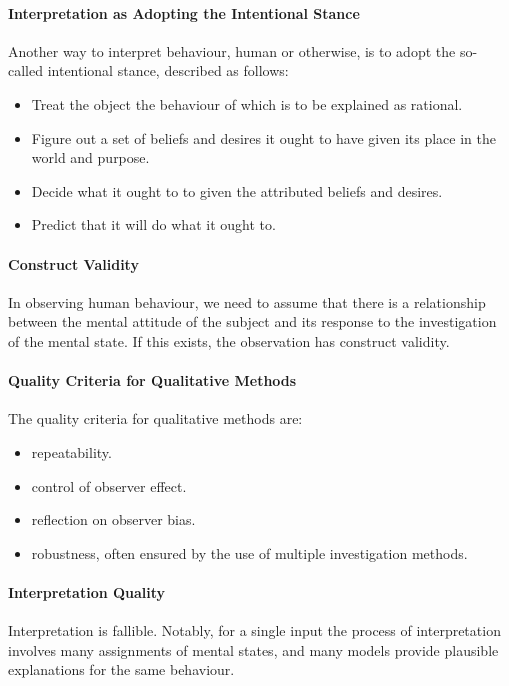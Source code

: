 \paragraph{Interpretation as Adopting the Intentional Stance}
Another way to interpret behaviour, human or otherwise, is to adopt the so-called intentional stance, described as follows:
\begin{itemize}
	\item Treat the object the behaviour of which is to be explained as rational.
	\item Figure out a set of beliefs and desires it ought to have given its place in the world and purpose.
	\item Decide what it ought to to given the attributed beliefs and desires.
	\item Predict that it will do what it ought to.
\end{itemize}

\paragraph{Construct Validity}
In observing human behaviour, we need to assume that there is a relationship between the mental attitude of the subject and its response to the investigation of the mental state. If this exists, the observation has construct validity.

\paragraph{Quality Criteria for Qualitative Methods}
The quality criteria for qualitative methods are:
\begin{itemize}
	\item repeatability.
	\item control of observer effect.
	\item reflection on observer bias.
	\item robustness, often ensured by the use of multiple investigation methods.
\end{itemize}

\paragraph{Interpretation Quality}
Interpretation is fallible. Notably, for a single input the process of interpretation involves many assignments of mental states, and many models provide plausible explanations for the same behaviour.

